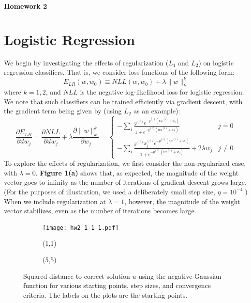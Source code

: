\documentclass[10pt,psamsfonts]{amsart}
\theoremstyle{definition}
\theoremstyle{remark}
\numberwithin{equation}{section}
\begin{document}
	

\begin{center}
	{\bf Homework 2}
\end{center}

\section{Logistic Regression}

We begin by investigating the effects of regularization ($L_1$ and $L_2$) on logistic regression classifiers. That is, we consider loss functions of the following form:
$$E_{LR}(w, w_0) \equiv NLL(w, w_0) + \lambda\|w\|_k^k$$
where $k = 1, 2$, and $NLL$ is the negative log-likelihood loss for logistic regression. We note that such classifiers can be trained efficiently via gradient descent, with the gradient term being given by (using $L_2$ as an example):
$$\frac{\partial E_{LR}}{\partial dw_j} = \frac{\partial NLL}{\partial dw_j} + \lambda \frac{\partial \|w\|_k^k}{\partial w_j} = \left\{ \begin{matrix} -\sum_i \frac{y^{(i)} e^{-y^{(i)}(wx^{(i)} + w_0)}}{1 + e^{-y^{(i)}(wx^{(i)} + w_0)}} & j =0 \\ -\sum_i \frac{y^{(i)} x^{(i)}_j e^{-y^{(i)}(wx^{(i)} + w_0)}}{1 + e^{-y^{(i)}(wx^{(i)} + w_0)}} + 2\lambda w_j & j \neq 0 \end{matrix}  \right.$$
To explore the effects of regularization, we first consider the non-regularized case, with $\lambda = 0$. {\bf Figure 1(a)} shows that, as expected, the magnitude of the weight vector goes to infinity as the number of iterations of gradient descent grows large. (For the purposes of illustration, we used a deliberately small step size, $\eta = 10^{-4}$.) When we include regularization at $\lambda = 1$, however, the magnitude of the weight vector stabilizes, even as the number of iterations becomes large.

\begin{figure}[b]
	\centering
	\begin{subfigure}[b]{0.23\textwidth}
		\texttt{[image: hw2\_1-1\_1.pdf]}
		\caption{(1,1)}
	\end{subfigure}
	\begin{subfigure}[b]{0.23\textwidth}
		\caption{(5,5)}
	\end{subfigure}
	\caption{Squared distance to correct solution $u$ using the negative Gaussian function for various starting points, step sizes, and convergence criteria. The labels on the plots are the starting points.}
\end{figure}
\end{document}
